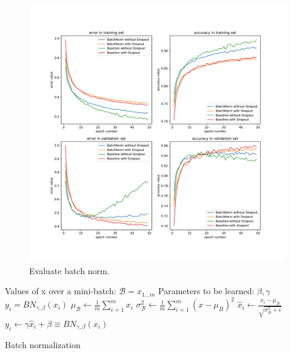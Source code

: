 \documentclass{article}
\begin{document}
\begin{figure}[tb]
\begin{center}
\centerline{\includegraphics[width=\columnwidth]{fig/batchnorm.pdf}}
\caption{Evaluate batch norm.}
\label{fig:batchnorm}
\end{center}
\end{figure} 



\begin{algorithm}[ht]
\begin{algorithmic}
    Values of x over a mini-batch: $\mathcal{B} = {x_{1...m}}$
    Parameters to be learned: $\beta, \gamma$ 
    $y_i = BN_{\gamma,\beta}(x_i)$ 
   \STATE $\mu_{\mathcal{B}} \gets \frac{1}{m} \sum\limits_{i=1}^{m} x_i$
   \STATE $ \sigma^2_{\mathcal{B}} \gets \frac{1}{m} \sum\limits_{i=1}^{m} (x- \mu_B)^2 $
   \STATE $ \hat x_i \gets \frac{x_i-\mu_\mathcal{B}}{\sqrt{\sigma^2_{\mathcal{B}}+\epsilon}} $
   \STATE $ y_i  \gets \gamma \hat x_i + \beta \equiv  BN_{\gamma,\beta}(x_i) $
   
\end{algorithmic}
  \caption{Batch normalization }
  \label{alg:batchnorm}
\end{algorithm}
\end{document}
